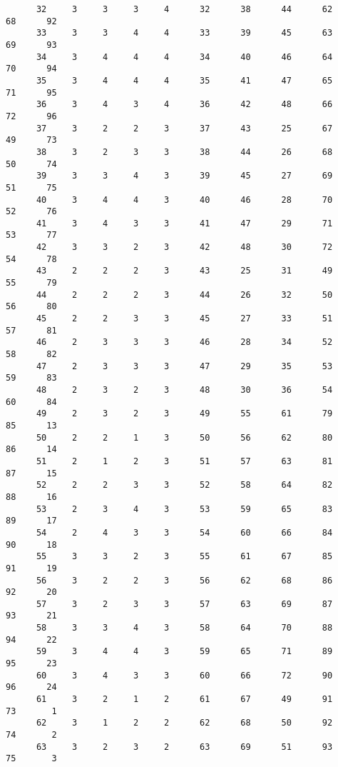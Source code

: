 \begin{verbatim}
      32     3     3     3     4      32      38      44      62      68      92 
      33     3     3     4     4      33      39      45      63      69      93 
      34     3     4     4     4      34      40      46      64      70      94 
      35     3     4     4     4      35      41      47      65      71      95 
      36     3     4     3     4      36      42      48      66      72      96 
      37     3     2     2     3      37      43      25      67      49      73 
      38     3     2     3     3      38      44      26      68      50      74 
      39     3     3     4     3      39      45      27      69      51      75 
      40     3     4     4     3      40      46      28      70      52      76 
      41     3     4     3     3      41      47      29      71      53      77 
      42     3     3     2     3      42      48      30      72      54      78 
      43     2     2     2     3      43      25      31      49      55      79 
      44     2     2     2     3      44      26      32      50      56      80 
      45     2     2     3     3      45      27      33      51      57      81 
      46     2     3     3     3      46      28      34      52      58      82 
      47     2     3     3     3      47      29      35      53      59      83 
      48     2     3     2     3      48      30      36      54      60      84 
      49     2     3     2     3      49      55      61      79      85      13 
      50     2     2     1     3      50      56      62      80      86      14 
      51     2     1     2     3      51      57      63      81      87      15 
      52     2     2     3     3      52      58      64      82      88      16 
      53     2     3     4     3      53      59      65      83      89      17 
      54     2     4     3     3      54      60      66      84      90      18 
      55     3     3     2     3      55      61      67      85      91      19 
      56     3     2     2     3      56      62      68      86      92      20 
      57     3     2     3     3      57      63      69      87      93      21 
      58     3     3     4     3      58      64      70      88      94      22 
      59     3     4     4     3      59      65      71      89      95      23 
      60     3     4     3     3      60      66      72      90      96      24 
      61     3     2     1     2      61      67      49      91      73       1 
      62     3     1     2     2      62      68      50      92      74       2 
      63     3     2     3     2      63      69      51      93      75       3 

\end{verbatim}
